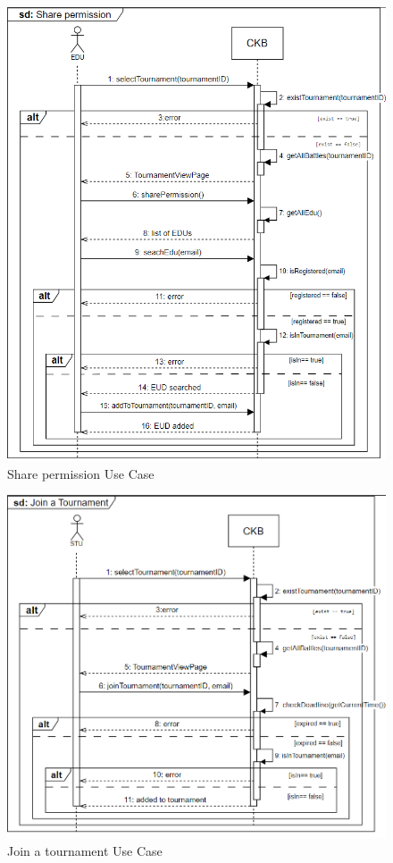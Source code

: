 \begin{figure}[H]
    \centering
    \includegraphics[width=1\textwidth]{images/sequence_diagrams/.png/Share_Permission - UC5.png}
    \caption{Share permission Use Case}
    \label{fig:uc5}
\end{figure}
\begin{figure}[H]
    \centering
    \includegraphics[width=1\textwidth]{images/sequence_diagrams/.png/Join_Tournament - UC6.png}
    \caption{Join a tournament Use Case}
    \label{fig:uc6}
\end{figure}
